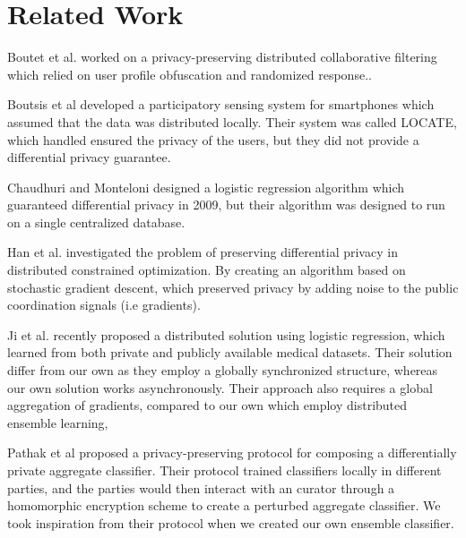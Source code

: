 
\section{Related Work}

Boutet et al. worked on a privacy-preserving distributed collaborative filtering which relied on user profile obfuscation and randomized response.\cite{boutet2013DisCollFil}.

Boutsis et al developed a participatory sensing system for smartphones which assumed that the data was distributed locally. Their system was called LOCATE, which handled ensured the privacy of the users, but they did not provide a differential privacy guarantee. \cite{boutsis2013}

Chaudhuri and Monteloni designed a logistic regression algorithm which guaranteed differential privacy in 2009, but their algorithm was designed to run on a single centralized database\cite{chaudhuri2009logistic}.

Han et al. investigated the problem of preserving differential privacy in distributed constrained optimization. By creating an algorithm based on stochastic gradient descent, which preserved privacy by adding noise to the public coordination signals (i.e gradients). \cite{han2014disOptimization}

Ji et al. \cite{ji2014DisLogReg} recently proposed a distributed solution using logistic regression, which learned from both private and publicly available medical datasets. Their solution differ from our own as they employ a globally synchronized structure, whereas our own solution works asynchronously. Their approach also requires a global aggregation of gradients, compared to our own which employ distributed ensemble learning,

Pathak et al \cite{pathak2010diffprivhomo} proposed a privacy-preserving protocol for composing a differentially private aggregate classifier. Their protocol trained classifiers locally in different parties, and the parties would then interact with an curator through a homomorphic encryption scheme to create a perturbed aggregate classifier. We took inspiration from their protocol when we created our own ensemble classifier.


